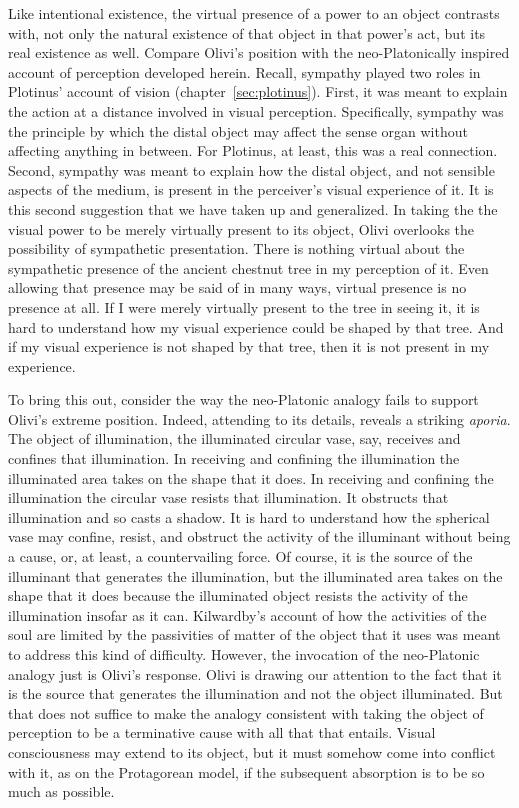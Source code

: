Like intentional existence, the virtual presence of a power to an object contrasts with, not only the natural existence of that object in that power's act, but its real existence as well. Compare Olivi's position with the neo-Platonically inspired account of perception developed herein. Recall, sympathy played two roles in Plotinus' account of vision (chapter~\ref{sec:plotinus}). First, it was meant to explain the action at a distance involved in visual perception. Specifically, sympathy was the principle by which the distal object may affect the sense organ without affecting anything in between. For Plotinus, at least, this was a real connection. Second, sympathy was meant to explain how the distal object, and not sensible aspects of the medium, is present in the perceiver's visual experience of it. It is this second suggestion that we have taken up and generalized. In taking the the visual power to be merely virtually present to its object, Olivi overlooks the possibility of sympathetic presentation. There is nothing virtual about the sympathetic presence of the ancient chestnut tree in my perception of it. Even allowing that presence may be said of in many ways, virtual presence is no presence at all. If I were merely virtually present to the tree in seeing it, it is hard to understand how my visual experience could be shaped by that tree. And if my visual experience is not shaped by that tree, then it is not present in my experience.

To bring this out, consider the way the neo-Platonic analogy fails to support Olivi's extreme position. Indeed, attending to its details, reveals a striking \emph{aporia}. The object of illumination, the illuminated circular vase, say, receives and confines that illumination. In receiving and confining the illumination the illuminated area takes on the shape that it does. In receiving and confining the illumination the circular vase resists that illumination. It obstructs that illumination and so casts a shadow. It is hard to understand how the spherical vase may confine, resist, and obstruct the activity of the illuminant without being a cause, or, at least, a countervailing force. Of course, it is the source of the illuminant that generates the illumination, but the illuminated area takes on the shape that it does because the illuminated object resists the activity of the illumination insofar as it can. Kilwardby's account of how the activities of the soul are limited by the passivities of matter of the object that it uses was meant to address this kind of difficulty. However, the invocation of the neo-Platonic analogy just is Olivi's response. Olivi is drawing our attention to the fact that it is the source that generates the illumination and not the object illuminated. But that does not suffice to make the analogy consistent with taking the object of perception to be a terminative cause with all that that entails. Visual consciousness may extend to its object, but it must somehow come into conflict with it, as on the Protagorean model, if the subsequent absorption is to be so much as possible. 

